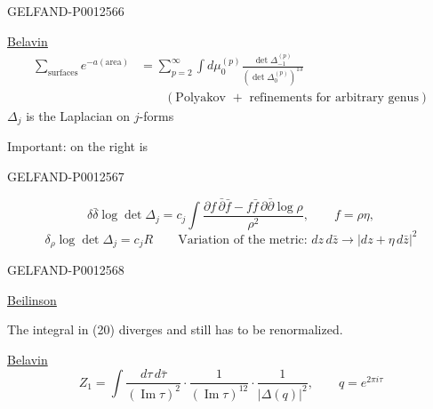 \begin{GelfandAdjacentEvidence}{GELFAND-P001256}{6}


\underline{\underline{Belavin}}
\begin{equation*}
\begin{aligned}
\sum_{\text{surfaces}}e^{-a(\text{area})}
&=\sum_{p=2}^{\infty}\int d\mu_0^{(p)}
\frac{\det\Delta_{-1}^{(p)}}{(\det\Delta_0^{(p)})^{13}}\\[-1pt]
&\hspace{2em}(\text{Polyakov $+$ refinements for arbitrary genus})
\end{aligned}\tag{20}
\end{equation*}
$\Delta_j$ is the Laplacian on $j$-forms

Important: on the right is
\end{GelfandAdjacentEvidence}
\begin{GelfandAdjacentEvidence}{GELFAND-P001256}{7}


\begin{equation*}
\delta\bar\delta\log\det\Delta_j
=c_j\int\frac{\partial f\,\bar\partial\bar f
-f\bar f\,\partial\bar\partial\log\rho}{\rho^2},
\qquad f=\rho\eta,\tag{21}
\end{equation*}
\begin{equation*}
\delta_{\rho}\log\det\Delta_j=c_jR
\qquad\text{Variation of the metric: }dz\,d\bar z\longrightarrow\lvert dz+\eta\,d\bar z\rvert^2
\tag{21'}
\end{equation*}
\end{GelfandAdjacentEvidence}
\begin{GelfandAdjacentEvidence}{GELFAND-P001256}{8}


\underline{Beilinson}

The integral in (20) diverges and still has to be renormalized.

\underline{Belavin}
\begin{equation*}
Z_1=\int\frac{d\tau\,d\bar\tau}{(\operatorname{Im}\tau)^2}
\cdot\frac{1}{(\operatorname{Im}\tau)^{12}}\cdot\frac{1}{\lvert\Delta(q)\rvert^2},
\qquad q=e^{2\pi i\tau}
\end{equation*}
\end{GelfandAdjacentEvidence}

